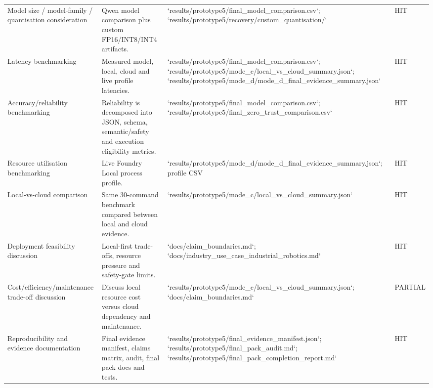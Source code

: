 \begin{longtable}{p{}p{}p{}p{}}
Model size / model-family / quantisation consideration & Qwen model comparison plus custom FP16/INT8/INT4 artifacts. & `results/prototype5/final\_model\_comparison.csv`; `results/prototype5/recovery/custom\_quantisation/` & HIT \\
Latency benchmarking & Measured model, local, cloud and live profile latencies. & `results/prototype5/final\_model\_comparison.csv`; `results/prototype5/mode\_c/local\_vs\_cloud\_summary.json`; `results/prototype5/mode\_d/mode\_d\_final\_evidence\_summary.json` & HIT \\
Accuracy/reliability benchmarking & Reliability is decomposed into JSON, schema, semantic/safety and execution eligibility metrics. & `results/prototype5/final\_model\_comparison.csv`; `results/prototype5/final\_zero\_trust\_comparison.csv` & HIT \\
Resource utilisation benchmarking & Live Foundry Local process profile. & `results/prototype5/mode\_d/mode\_d\_final\_evidence\_summary.json`; profile CSV & HIT \\
Local-vs-cloud comparison & Same 30-command benchmark compared between local and cloud evidence. & `results/prototype5/mode\_c/local\_vs\_cloud\_summary.json` & HIT \\
Deployment feasibility discussion & Local-first trade-offs, resource pressure and safety-gate limits. & `docs/claim\_boundaries.md`; `docs/industry\_use\_case\_industrial\_robotics.md` & HIT \\
Cost/efficiency/maintenance trade-off discussion & Discuss local resource cost versus cloud dependency and maintenance. & `results/prototype5/mode\_c/local\_vs\_cloud\_summary.json`; `docs/claim\_boundaries.md` & PARTIAL \\
Reproducibility and evidence documentation & Final evidence manifest, claims matrix, audit, final pack docs and tests. & `results/prototype5/final\_evidence\_manifest.json`; `results/prototype5/final\_pack\_audit.md`; `results/prototype5/final\_pack\_completion\_report.md` & HIT \\
        \bottomrule
        \end{longtable}
